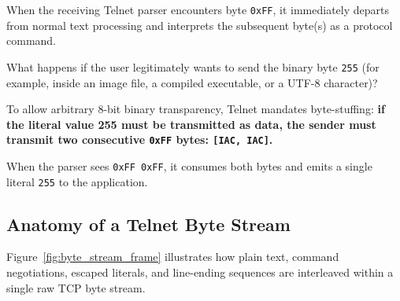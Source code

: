 When the receiving Telnet parser encounters byte \texttt{0xFF}, it immediately departs from normal text processing and interprets the subsequent byte(s) as a protocol command.

\begin{beginnerconcept}
What happens if the user legitimately wants to send the binary byte \texttt{255} (for example, inside an image file, a compiled executable, or a UTF-8 character)?

To allow arbitrary 8-bit binary transparency, Telnet mandates byte-stuffing: \textbf{if the literal value 255 must be transmitted as data, the sender must transmit two consecutive \texttt{0xFF} bytes: \texttt{[IAC, IAC]}.} 

When the parser sees \texttt{0xFF 0xFF}, it consumes both bytes and emits a single literal \texttt{255} to the application.
\end{beginnerconcept}

\subsection{Anatomy of a Telnet Byte Stream}

Figure~\ref{fig:byte_stream_frame} illustrates how plain text, command negotiations, escaped literals, and line-ending sequences are interleaved within a single raw TCP byte stream.

